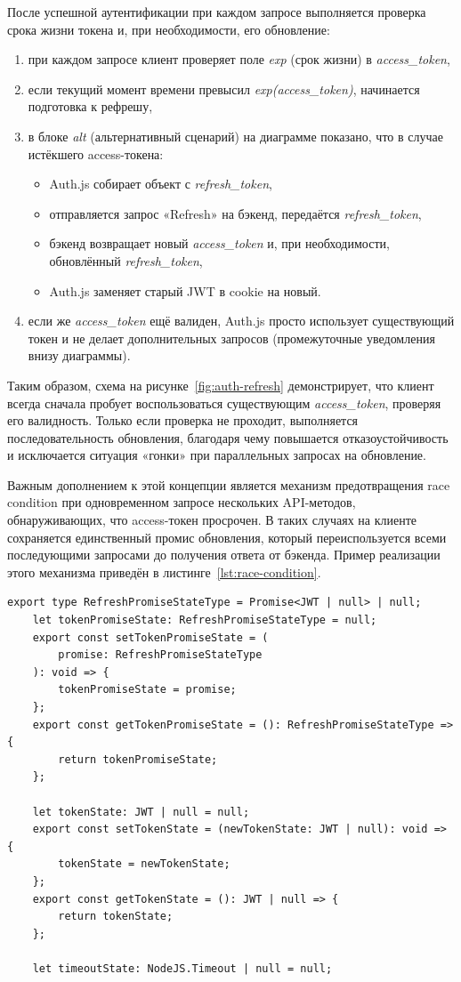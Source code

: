 После успешной аутентификации при каждом запросе выполняется проверка срока жизни токена и, при необходимости, его обновление:
\begin{enumerate}
    \item при каждом запросе клиент проверяет поле \textit{exp} (срок жизни) в \textit{access\_token},
    \item если текущий момент времени превысил \textit{exp(access\_token)}, начинается подготовка к рефрешу,
    \item в блоке \textit{alt} (альтернативный сценарий) на диаграмме показано, что в случае истёкшего access-токена:
    \begin{itemize}
        \item Auth.js собирает объект с \textit{refresh\_token},
        \item отправляется запрос «Refresh» на бэкенд, передаётся \textit{refresh\_token},
        \item бэкенд возвращает новый \textit{access\_token} и, при необходимости, обновлённый \textit{refresh\_token},
        \item Auth.js заменяет старый JWT в cookie на новый.
    \end{itemize}
    \item если же \textit{access\_token} ещё валиден, Auth.js просто использует существующий токен и не делает дополнительных запросов (промежуточные уведомления внизу диаграммы).
\end{enumerate}

Таким образом, схема на рисунке~\ref{fig:auth-refresh} демонстрирует, что клиент всегда сначала пробует воспользоваться существующим \textit{access\_token}, проверяя его валидность. Только если проверка не проходит, выполняется последовательность обновления, благодаря чему повышается отказоустойчивость и исключается ситуация «гонки» при параллельных запросах на обновление.

Важным дополнением к этой концепции является механизм предотвращения race condition при одновременном запросе нескольких API-методов, обнаруживающих, что access-токен просрочен. В таких случаях на клиенте сохраняется единственный промис обновления, который переиспользуется всеми последующими запросами до получения ответа от бэкенда. Пример реализации этого механизма приведён в листинге~\ref{lst:race-condition}.

\begin{lstlisting}[caption={Механизм предотвращения race condition при рефреше токена}, label={lst:race-condition}]
	export type RefreshPromiseStateType = Promise<JWT | null> | null;
	let tokenPromiseState: RefreshPromiseStateType = null;
	export const setTokenPromiseState = (
		promise: RefreshPromiseStateType
	): void => {
		tokenPromiseState = promise;
	};
	export const getTokenPromiseState = (): RefreshPromiseStateType => {
		return tokenPromiseState;
	};

	let tokenState: JWT | null = null;
	export const setTokenState = (newTokenState: JWT | null): void => {
		tokenState = newTokenState;
	};
	export const getTokenState = (): JWT | null => {
		return tokenState;
	};

	let timeoutState: NodeJS.Timeout | null = null;
\end{lstlisting}

